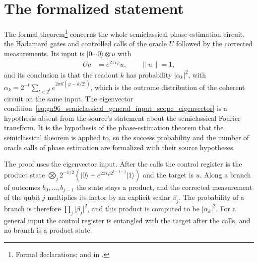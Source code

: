 \documentclass{article}
\begin{document}
\section{The formalized statement}
The formal theorem\footnote{Formal declarations:
     and
     in
    .}
concerns the whole semiclassical phase-estimation circuit, the Hadamard
gates and controlled calls of the oracle $U$ followed by the corrected
measurements. Its input is $\lvert0\cdots0\rangle\otimes u$ with
\begin{align}
    Uu & =e^{2\pi i\varphi}u,\qquad \lVert u\rVert=1,
    \label{eq:gn96_semiclassical_general_input_scope_eigenvector}
\end{align}
and its conclusion is that the readout $k$ has probability
$\lvert\alpha_k\rvert^2$, with
$\alpha_k=2^{-t}\sum_{l<2^t}e^{2\pi il(\varphi-k/2^t)}$, which is the outcome
distribution of the coherent circuit on the same input. The eigenvector
condition~\eqref{eq:gn96_semiclassical_general_input_scope_eigenvector} is a
hypothesis absent from the source's statement about the semiclassical Fourier
transform. It is the hypothesis of the phase-estimation theorem that the
semiclassical theorem is applied to, so the success probability and the number
of oracle calls of phase estimation are formalized with their source
hypotheses.

The proof uses the eigenvector input. After the calls the control register is
the product state
$\bigotimes_j2^{-1/2}(\lvert0\rangle+e^{2\pi i\varphi2^{t-1-j}}\lvert1\rangle)$
and the target is $u$. Along a branch of outcomes $b_0,\dots,b_{j-1}$ the state
stays a product, and the corrected measurement of the qubit $j$ multiplies its
factor by an explicit scalar $\beta_j$. The probability of a branch is
therefore $\prod_j\lvert\beta_j\rvert^2$, and this product is computed to be
$\lvert\alpha_k\rvert^2$. For a general input the control register is
entangled with the target after the calls, and no branch is a product state.
\end{document}
